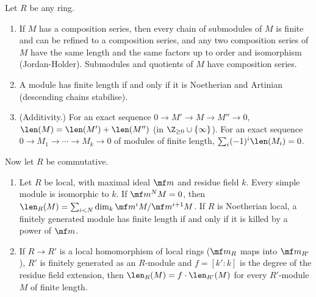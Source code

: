 \begin{theorem}\label{thm:modules:jordan-holder}
Let $R$ be any ring.
\begin{enumerate}[label=(\roman*)]
\item If $M$ has a composition series, then every chain of submodules of $M$ is finite and can be refined to a composition series, and
any two composition series of $M$ have the same length and the same factors up to order and isomorphism (Jordan-Holder).
Submodules and quotients of $M$ have composition series.
\item A module has finite length if and only if it is Noetherian and Artinian (descending chains stabilise).
\item (Additivity.) For an exact sequence $0\to M'\to M\to M''\to0$, $\len(M)=\len(M')+\len(M'')$ (in $\Z_{\ge0}\cup\{\infty\}$). For an exact sequence
$0\to M_1\to\cdots\to M_k\to0$ of modules of finite length, $\sum_i(-1)^i\len(M_i)=0$.
\end{enumerate}
Now let $R$ be commutative.
\begin{enumerate}[label=(\roman*),resume]
\item Let $R$ be local, with maximal ideal $\mf m$ and residue field $k$. Every simple module is isomorphic to $k$. If $\mf m^NM=0$, then
$\len_R(M)=\sum_{i<N}\dim_k\mf m^iM/\mf m^{i+1}M$. If $R$ is Noetherian local, a finitely generated module has finite length if and only if it is
killed by a power of $\mf m$.
\item If $R\to R'$ is a local homomorphism of local rings ($\mf m_R$ maps into $\mf m_{R'}$), $R'$ is finitely generated as an $R$-module and
$f=[k':k]$ is the degree of the residue field extension, then $\len_R(M)=f\cdot\len_{R'}(M)$ for every $R'$-module $M$ of finite length.
\end{enumerate}
\end{theorem}

